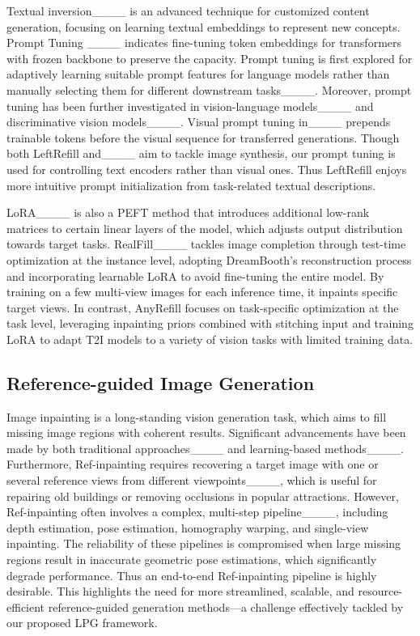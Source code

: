 Textual inversion____ is an advanced technique for customized content generation, focusing on learning textual embeddings to represent new concepts. Prompt Tuning ____ indicates fine-tuning token embeddings for transformers with frozen backbone to preserve the capacity. Prompt tuning is first explored for adaptively learning suitable prompt features for language models rather than manually selecting them for different downstream tasks____. Moreover, prompt tuning has been further investigated in vision-language models____ and discriminative vision models____.
Visual prompt tuning in____ prepends trainable tokens before the visual sequence for transferred generations. 
Though both LeftRefill and____ aim to tackle image synthesis, our prompt tuning is used for controlling text encoders rather than visual ones. 
Thus LeftRefill enjoys more intuitive prompt initialization from task-related textual descriptions.

LoRA____ is also a PEFT method that introduces additional low-rank matrices to certain linear layers of the model, which adjusts output distribution towards target tasks. RealFill____ tackles image completion through test-time optimization at the instance level, adopting DreamBooth’s reconstruction process and incorporating learnable LoRA to avoid fine-tuning the entire model. By training on a few multi-view images for each inference time, it inpaints specific target views. In contrast, AnyRefill focuses on task-specific optimization at the task level, leveraging inpainting priors combined with stitching input and training LoRA to adapt T2I models to a variety of vision tasks with limited training data.

\subsection{Reference-guided Image Generation}
Image inpainting is a long-standing vision generation task, which aims to fill missing image regions with coherent results. Significant advancements have been made by both traditional approaches____ and learning-based methods____.
Furthermore, Ref-inpainting requires recovering a target image with one or several reference views from different viewpoints____, which is useful for repairing old buildings or removing occlusions in popular attractions. However, Ref-inpainting often involves a complex, multi-step pipeline____, including depth estimation, pose estimation, homography warping, and single-view inpainting.
The reliability of these pipelines is compromised when large missing regions result in inaccurate geometric pose estimations, which significantly degrade performance. Thus an end-to-end Ref-inpainting pipeline is highly desirable. This highlights the need for more streamlined, scalable, and resource-efficient reference-guided generation methods—a challenge effectively tackled by our proposed LPG framework.

